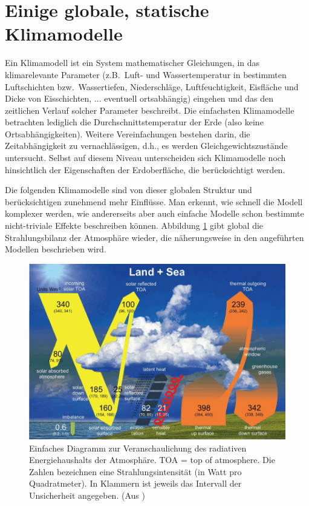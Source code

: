 \section{Einige globale, statische Klimamodelle}

Ein Klimamodell ist ein System mathematischer Gleichungen, in das klimarelevante
Parameter (z.B.\ Luft- und Wassertemperatur in bestimmten Luftschichten bzw.\
Wassertiefen, Niederschl\"age, Luftfeuchtigkeit, 
Eisfl\"ache und Dicke von Eisschichten, ... eventuell ortsabh\"angig) eingehen und das
den zeitlichen Verlauf solcher Parameter beschreibt. Die einfachsten Klimamodelle betrachten
lediglich die Durchschnittstemperatur der Erde (also keine Ortsabh\"angigkeiten). Weitere
Vereinfachungen bestehen darin, die Zeitabh\"angigkeit zu vernachl\"assigen, d.h., es werden
Gleichgewichtszust\"ande untersucht. Selbst auf diesem Niveau unterscheiden sich
Klimamodelle noch hinsichtlich der Eigenschaften der Erdoberfl\"ache, die ber\"ucksichtigt werden.

Die folgenden Klimamodelle sind von dieser globalen Struktur und ber\"ucksichtigen zunehmend
mehr Einfl\"usse. Man erkennt, wie schnell die Modell komplexer werden, wie andererseits
aber auch einfache Modelle schon bestimmte nicht-triviale Effekte beschreiben k\"onnen. 
Abbildung \ref{fig_Bilanz} gibt global die Strahlungsbilanz der Atmosph\"are wieder, die 
n\"aherungsweise in den angef\"uhrten Modellen beschrieben wird.

\begin{figure}
\includegraphics[scale = 0.3]{./Bilder_Klima/Bilanz.jpg}
\caption{\label{fig_Bilanz}%
Einfaches Diagramm zur Veranschaulichung des radiativen Energiehaushalts
der Atmosph\"are. TOA = top of atmosphere. Die Zahlen bezeichnen eine
Strahlungsintensit\"at (in Watt pro Quadratmeter). In Klammern ist jeweils
das Intervall der Unsicherheit angegeben. (Aus \cite{Sanchez})} 
\end{figure}

